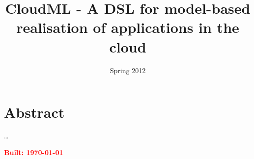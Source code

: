 \documentclass{article}
\begin{document}
\title{CloudML - A DSL for model-based realisation of applications in the cloud}
\date{Spring 2012}

\maketitle
\section*{Abstract}
\ldots

\textcolor{red}{\textbf{Built: \today}}

\tableofcontents{}







\end{document}

